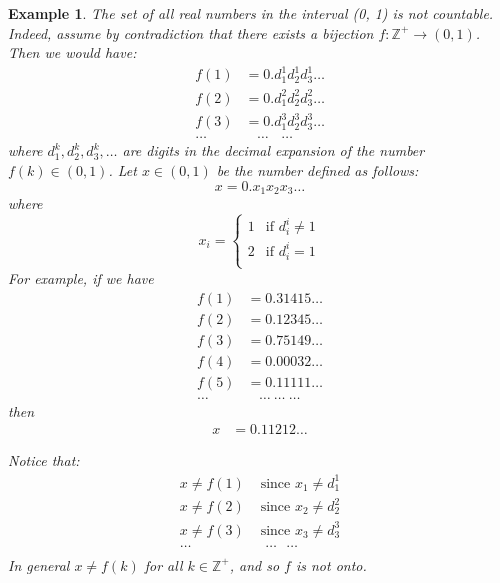 \documentclass[11pt, letterpaper, oneside]{report}
\theoremstyle{pplain}
\newtheorem{ITERMVALUE THM}[theorem]{Intermediate Value Theorem}
\newtheorem{HEINEBOREL THM}[theorem]{Heine-Borel Theorem}
\newtheorem{UMETR THM}[theorem]{Urysohn Metrization Theorem}
\newtheorem{UMETR2 THM}[theorem]{Urysohn Metrization Theorem (v.2)}
\theoremstyle{ddefinition}
\newtheorem{example}[theorem]{Example}
\theoremstyle{nnn}
\newtheorem{TDA NN}[theorem]{Topological Data Analysis. }
\theoremstyle{eexercise}
\newcommand{\Z}{{\mathbb Z}}
\begin{document}
\begin{example}
The set of all real numbers in the interval (0, 1) is not countable. 
Indeed, assume by contradiction
that there exists a bijection  $f\colon \Z^{+}\to (0,1)$. Then we would have:
\begin{align*}
f(1) & = 0.d^{1}_{1} d^{1}_{2} d^{1}_{3} \dots \\
f(2) & = 0.d^{2}_{1} d^{2}_{2} d^{2}_{3} \dots \\
f(3) & = 0.d^{3}_{1} d^{3}_{2} d^{3}_{3} \dots \\
\dots & \ \ \ \ \dots \ \ \ \  \dots 
\end{align*}
where $d^{k}_{1}, d^{k}_{2}, d^{k}_{3}, \dots $ are digits in the decimal expansion of the number 
$f(k)\in (0, 1)$. Let $x\in (0, 1)$ be the number defined as follows:
$$x= 0.x_{1}x_{2}x_{3}\dots$$
where 
$$
x_{i} = 
\begin{cases}
1 & \text{if $d^{i}_{i} \neq 1$} \\
2 & \text{if $d^{i}_{i} = 1$} \\
\end{cases}
$$
For example,  if we have 
\begin{align*}
f(1) & = 0.31415 \dots \\
f(2) & = 0.12345 \dots \\
f(3) & = 0.75149 \dots \\
f(4) & = 0.00032 \dots \\
f(5) & = 0.11111 \dots \\
\dots & \ \ \ \ \dots \ \dots \ \dots
\end{align*}
then
\begin{align*}
x & = 0.11212\dots
\end{align*} 

Notice that: 
\begin{align*}
x\neq f(1) & \text{\ \  since $x_{1}\neq d^{1}_{1}$} \\
x\neq f(2) & \text{\ \  since $x_{2}\neq d^{2}_{2}$} \\
x\neq f(3) & \text{\ \  since $x_{3}\neq d^{3}_{3}$} \\
\dots \ \ \ \ \  & \ \ \ \dots \ \ \ \dots  \\ 
\end{align*}
In general $x\neq f(k)$ for all $k\in \Z^{+}$, and so $f$ is not onto. 

\end{example}
\end{document}
